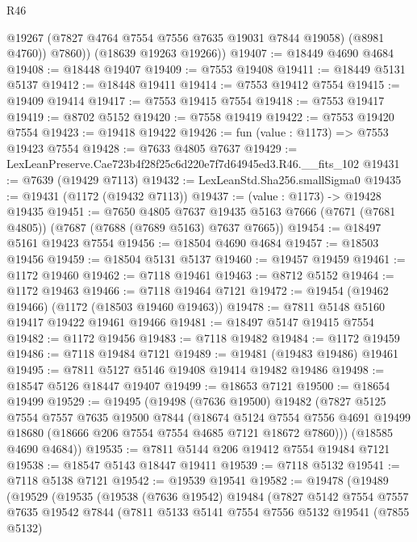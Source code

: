 \begin{lexlean}{R46}
\begin{coremodule}
            @19267
            (@7827 @4764 @7554 @7556 @7635 @19031 @7844 @19058)
            (@8981 @4760))
          @7860))
      (@18639 @19263 @19266))
@19407 := @18449 @4690 @4684
@19408 := @18448 @19407
@19409 := @7553 @19408
@19411 := @18449 @5131 @5137
@19412 := @18448 @19411
@19414 := @7553 @19412 @7554
@19415 := @19409 @19414
@19417 := @7553 @19415 @7554
@19418 := @7553 @19417
@19419 := @8702 @5152
@19420 := @7558 @19419
@19422 := @7553 @19420 @7554
@19423 := @19418 @19422
@19426 := fun (value : @1173) => @7553 @19423 @7554
@19428 := @7633 @4805 @7637
@19429 := LexLeanPreserve.Cae723b4f28f25c6d220e7f7d64945ed3.R46.__fits_102
@19431 := @7639 (@19429 @7113)
@19432 := LexLeanStd.Sha256.smallSigma0
@19435 := @19431 (@1172 (@19432 @7113))
@19437 := (value : @1173) -> @19428 @19435
@19451 := @7650
    @4805
    @7637
    @19435
    @5163
    @7666
    (@7671 (@7681 @4805))
    (@7687 (@7688 (@7689 @5163) @7637 @7665))
@19454 := @18497 @5161 @19423 @7554
@19456 := @18504 @4690 @4684
@19457 := @18503 @19456
@19459 := @18504 @5131 @5137
@19460 := @19457 @19459
@19461 := @1172 @19460
@19462 := @7118 @19461
@19463 := @8712 @5152
@19464 := @1172 @19463
@19466 := @7118 @19464 @7121
@19472 := @19454 (@19462 @19466) (@1172 (@18503 @19460 @19463))
@19478 := @7811 @5148 @5160 @19417 @19422 @19461 @19466
@19481 := @18497 @5147 @19415 @7554
@19482 := @1172 @19456
@19483 := @7118 @19482
@19484 := @1172 @19459
@19486 := @7118 @19484 @7121
@19489 := @19481 (@19483 @19486) @19461
@19495 := @7811 @5127 @5146 @19408 @19414 @19482 @19486
@19498 := @18547 @5126 @18447 @19407
@19499 := @18653 @7121
@19500 := @18654 @19499
@19529 := @19495
    (@19498
      (@7636 @19500)
      @19482
      (@7827
        @5125
        @7554
        @7557
        @7635
        @19500
        @7844
        (@18674
          @5124
          @7554
          @7556
          @4691
          @19499
          @18680
          (@18666 @206 @7554 @7554 @4685 @7121 @18672 @7860)))
      (@18585 @4690 @4684))
@19535 := @7811 @5144 @206 @19412 @7554 @19484 @7121
@19538 := @18547 @5143 @18447 @19411
@19539 := @7118 @5132
@19541 := @7118 @5138 @7121
@19542 := @19539 @19541
@19582 := @19478
    (@19489
      (@19529
        (@19535
          (@19538
            (@7636 @19542)
            @19484
            (@7827
              @5142
              @7554
              @7557
              @7635
              @19542
              @7844
              (@7811
                @5133
                @5141
                @7554
                @7556
                @5132
                @19541
                (@7855 @5132)

\end{coremodule}
\end{lexlean}
